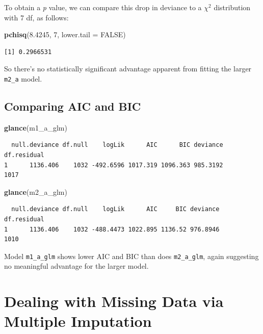 \documentclass[]{book}
\newenvironment{Shaded}{\begin{snugshade}}{\end{snugshade}}
\newcommand{\KeywordTok}[1]{\textcolor[rgb]{0.13,0.29,0.53}{\textbf{#1}}}
\newcommand{\DataTypeTok}[1]{\textcolor[rgb]{0.13,0.29,0.53}{#1}}
\newcommand{\DecValTok}[1]{\textcolor[rgb]{0.00,0.00,0.81}{#1}}
\newcommand{\FloatTok}[1]{\textcolor[rgb]{0.00,0.00,0.81}{#1}}
\newcommand{\OtherTok}[1]{\textcolor[rgb]{0.56,0.35,0.01}{#1}}
\newcommand{\NormalTok}[1]{#1}
\theoremstyle{definition}
\theoremstyle{definition}
\theoremstyle{definition}
\theoremstyle{remark}
\begin{document}
To obtain a \emph{p} value, we can compare this drop in deviance to a
\(\chi^2\) distribution with 7 df, as follows:

\begin{Shaded}
\begin{Highlighting}[]
\KeywordTok{pchisq}\NormalTok{(}\FloatTok{8.4245}\NormalTok{, }\DecValTok{7}\NormalTok{, }\DataTypeTok{lower.tail =} \OtherTok{FALSE}\NormalTok{)}
\end{Highlighting}
\end{Shaded}

\begin{verbatim}
[1] 0.2966531
\end{verbatim}

So there's no statistically significant advantage apparent from fitting
the larger \texttt{m2\_a} model.

\subsection{Comparing AIC and BIC}\label{comparing-aic-and-bic}

\begin{Shaded}
\begin{Highlighting}[]
\KeywordTok{glance}\NormalTok{(m1_a_glm)}
\end{Highlighting}
\end{Shaded}

\begin{verbatim}
  null.deviance df.null    logLik      AIC      BIC deviance df.residual
1      1136.406    1032 -492.6596 1017.319 1096.363 985.3192        1017
\end{verbatim}

\begin{Shaded}
\begin{Highlighting}[]
\KeywordTok{glance}\NormalTok{(m2_a_glm)}
\end{Highlighting}
\end{Shaded}

\begin{verbatim}
  null.deviance df.null    logLik      AIC     BIC deviance df.residual
1      1136.406    1032 -488.4473 1022.895 1136.52 976.8946        1010
\end{verbatim}

Model \texttt{m1\_a\_glm} shows lower AIC and BIC than does
\texttt{m2\_a\_glm}, again suggesting no meaningful advantage for the
larger model.

\section{Dealing with Missing Data via Multiple
Imputation}\label{dealing-with-missing-data-via-multiple-imputation}
\end{document}
